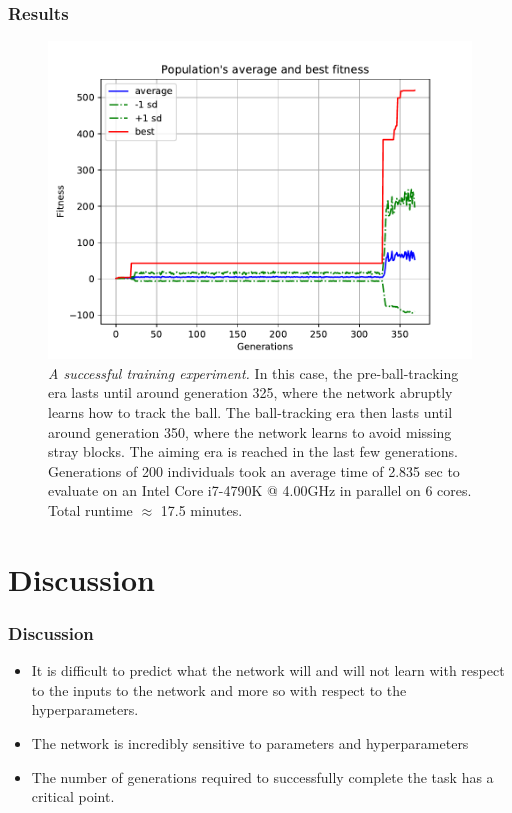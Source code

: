 \documentclass[t,pdflatex]{beamer}
\begin{document}
    \begin{frame}

        \frametitle{Results}
         \begin{figure}[h!]
            \centering
            \includegraphics[width=.54 \textwidth]{avg_fitness.pdf}
            \caption{\textit{A successful training experiment.} In this case, the pre-ball-tracking era lasts
                until around generation 325, where the network abruptly learns how to track the ball.
                The ball-tracking era then lasts until around generation 350, where the network learns to avoid missing stray blocks. The aiming era is reached in the last few generations.
                Generations of 200 individuals took an average time of 2.835 sec to evaluate on an
                Intel Core i7-4790K @ 4.00GHz in parallel on 6 cores. Total runtime $\approx$ 17.5 minutes.}
        \end{figure}

    \end{frame}

\section{Discussion}

        \begin{frame}

        \frametitle{Discussion}
         \begin{itemize}
             \item It is difficult to predict what the network will and will not learn with respect to the inputs to the network and more so with respect to the hyperparameters.
             \item The network is incredibly sensitive to parameters and hyperparameters
             \item The number of generations required to successfully complete the task has a critical point.
         \end{itemize}

    \end{frame}

\end{document}
